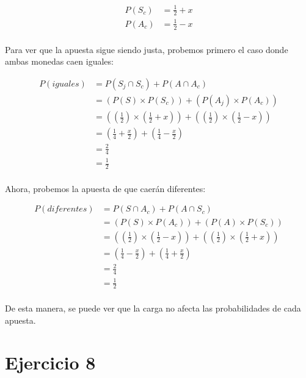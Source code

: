 \documentclass[letterpaper,12pt]{memoir}
\theoremstyle{definition}
\begin{document}
\begin{equation*}
  \begin{split}
  P(S_c) &= \frac{1}{2} + x\\
  P(A_c) &= \frac{1}{2} - x\\
  \end{split}
\end{equation*}

Para ver que la apuesta sigue siendo justa, probemos primero el caso donde ambas monedas caen iguales:

\begin{equation*}
\begin{split}
  P(iguales) &= P(S_j\cap S_c) + P(A\cap A_c)\\
   &= (P(S) \times P(S_c)) + (P(A_j) \times P(A_c))\\
   &= ((\frac{1}{2}) \times (\frac{1}{2} + x)) + ((\frac{1}{2}) \times (\frac{1}{2} - x))\\
   &= (\frac{1}{4} + \frac{x}{2}) + (\frac{1}{4} - \frac{x}{2})\\
   &= \frac{2}{4}\\
   &= \frac{1}{2}\\
  \end{split}
\end{equation*}

Ahora, probemos la apuesta de que caerán diferentes:

\begin{equation*}
  \begin{split}
    P(diferentes) &= P(S\cap A_c) + P(A\cap S_c)\\
    &= (P(S) \times P(A_c)) + (P(A) \times P(S_c))\\
    &= ((\frac{1}{2}) \times (\frac{1}{2} - x)) + ((\frac{1}{2}) \times (\frac{1}{2} + x))\\
    &= (\frac{1}{4} - \frac{x}{2}) + (\frac{1}{4} + \frac{x}{2})\\
    &= \frac{2}{4}\\
    &= \frac{1}{2}\\
  \end{split}
  \end{equation*}

De esta manera, se puede ver que la carga no afecta las probabilidades de cada apuesta.


\section*{Ejercicio 8}
\end{document}
